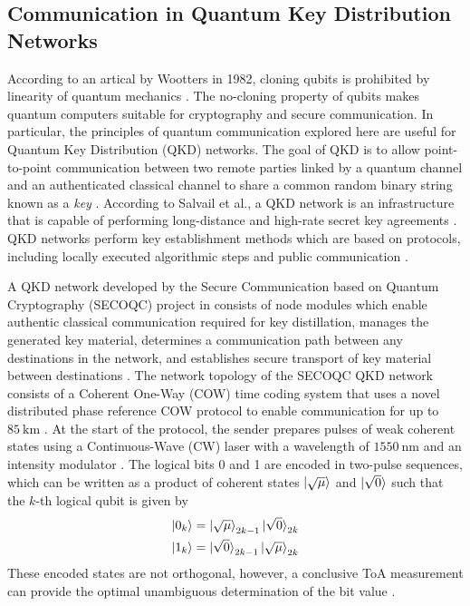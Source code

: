 \subsection{Communication in Quantum Key Distribution Networks}

According to an artical by Wootters in 1982, cloning qubits is prohibited by linearity of quantum mechanics \cite{wootters1982single}. The no-cloning property of qubits makes quantum computers suitable for cryptography and secure communication. In particular, the principles of quantum communication explored here are useful for Quantum Key Distribution (QKD) networks. The goal of QKD is to allow point-to-point communication between two remote parties linked by a quantum channel and an authenticated classical channel to share a common random binary string known as a \textit{key} \cite{salvail2010security}.  According to Salvail et al., a QKD network is an infrastructure that is capable of performing long-distance and high-rate secret key agreements \cite{salvail2010security}. QKD networks perform key establishment methods which are based on protocols, including locally executed algorithmic steps and public communication \cite{salvail2010security}. 

A QKD network developed by the Secure Communication based on Quantum Cryptography (SECOQC) project in consists of node modules which enable authentic classical communication required for key distillation, manages the generated key material, determines a communication path between any destinations in the network, and establishes secure transport of key material between destinations \cite{peev2009secoqc}. The network topology of the SECOQC QKD network consists of a Coherent One-Way (COW) time coding system that uses a novel distributed phase reference COW protocol to enable communication for up to $\SI{85}{\kilo\meter}$ \cite{peev2009secoqc}. At the start of the protocol, the sender prepares pulses of weak coherent states using a Continuous-Wave (CW) laser with a wavelength of $\SI{1550}{\nano\meter}$ and an intensity modulator \cite{peev2009secoqc}. The logical bits 0 and 1 are encoded in two-pulse sequences, which can be written as a product of coherent states $\ket{\sqrt{\mu}}$ and $\ket{\sqrt{0}}$ such that the $k$-th logical qubit is given by
\begin{align}\label{eqn:secoqc-kth-bit}
	\ket{0_k}	& = \ket{\sqrt{\mu}}_{2k-1} \ket{\sqrt{0}}_{2k}\nonumber\\
	\ket{1_k}	& = \ket{\sqrt{0}}_{2k-1} \ket{\sqrt{\mu}}_{2k}
\end{align} 
These encoded states are not orthogonal, however, a conclusive ToA measurement can provide the optimal unambiguous determination of the bit value \cite{gisin2004towards}.

